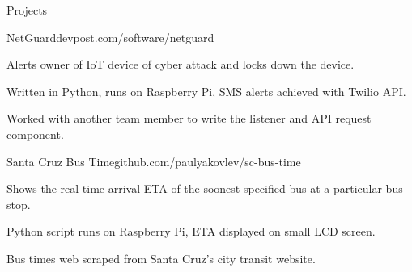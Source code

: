 \documentclass{resume} %
\begin{document}

\begin{rSection}{Projects}

\begin{rSubsection}{NetGuard}{devpost.com/software/netguard}{}{}
    \item Alerts owner of IoT device of cyber attack and locks down the device.
    \item Written in Python, runs on Raspberry Pi, SMS alerts achieved with Twilio API.
    \item Worked with another team member to write the listener and API request component.
\end{rSubsection}

\begin{rSubsection}{Santa Cruz Bus Time}{github.com/paulyakovlev/sc-bus-time}{}{}
    \item Shows the real-time arrival ETA of the soonest specified bus at a particular bus stop.
    \item Python script runs on Raspberry Pi, ETA displayed on small LCD screen.
    \item Bus times web scraped from Santa Cruz’s city transit website.
\end{rSubsection}

\end{rSection}










\end{document}
